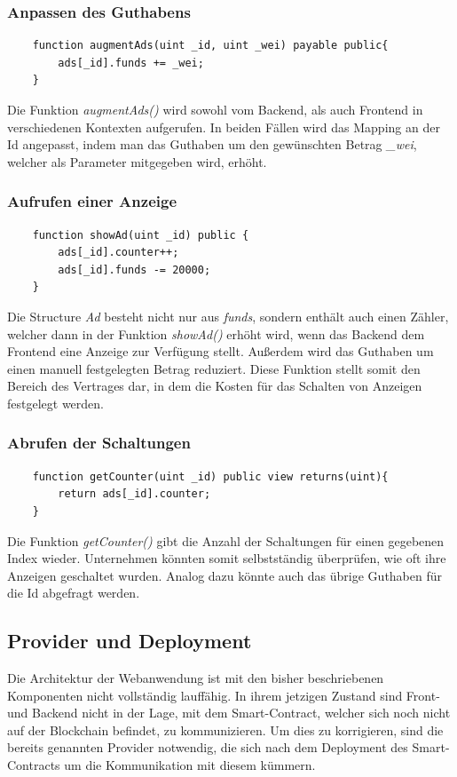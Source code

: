\subsubsection{Anpassen des Guthabens}
\begin{lstlisting}
	function augmentAds(uint _id, uint _wei) payable public{
		ads[_id].funds += _wei;
	}
\end{lstlisting}
Die Funktion \emph{augmentAds()} wird sowohl vom Backend, als auch Frontend in verschiedenen Kontexten aufgerufen. In beiden Fällen wird das Mapping an der Id angepasst, indem man das Guthaben um den gewünschten Betrag \emph{\_wei}, welcher als Parameter mitgegeben wird, erhöht. 
\subsubsection{Aufrufen einer Anzeige}
\begin{lstlisting}
	function showAd(uint _id) public {
		ads[_id].counter++;
		ads[_id].funds -= 20000;
	}
\end{lstlisting}
Die Structure \emph{Ad} besteht nicht nur aus \emph{funds}, sondern enthält auch einen Zähler, welcher dann in der Funktion \emph{showAd()} erhöht wird, wenn das Backend dem Frontend eine Anzeige zur Verfügung stellt. Außerdem wird das Guthaben um einen manuell festgelegten Betrag reduziert. Diese Funktion stellt somit den Bereich des Vertrages dar, in dem die Kosten für das Schalten von Anzeigen festgelegt werden.
\subsubsection{Abrufen der Schaltungen}
\begin{lstlisting}
	function getCounter(uint _id) public view returns(uint){
		return ads[_id].counter;
	}
\end{lstlisting}
Die Funktion \emph{getCounter()} gibt die Anzahl der Schaltungen für einen gegebenen Index wieder. Unternehmen könnten somit selbstständig überprüfen, wie oft ihre Anzeigen geschaltet wurden. Analog dazu könnte auch das übrige Guthaben für die Id abgefragt werden. 
\subsection{Provider und Deployment}
Die Architektur der Webanwendung ist mit den bisher beschriebenen Komponenten nicht vollständig lauffähig. In ihrem jetzigen Zustand sind Front- und Backend nicht in der Lage, mit dem Smart-Contract, welcher sich noch nicht auf der Blockchain befindet, zu kommunizieren. Um dies zu korrigieren, sind die bereits genannten Provider notwendig, die sich nach dem Deployment des Smart-Contracts um die Kommunikation mit diesem kümmern.
